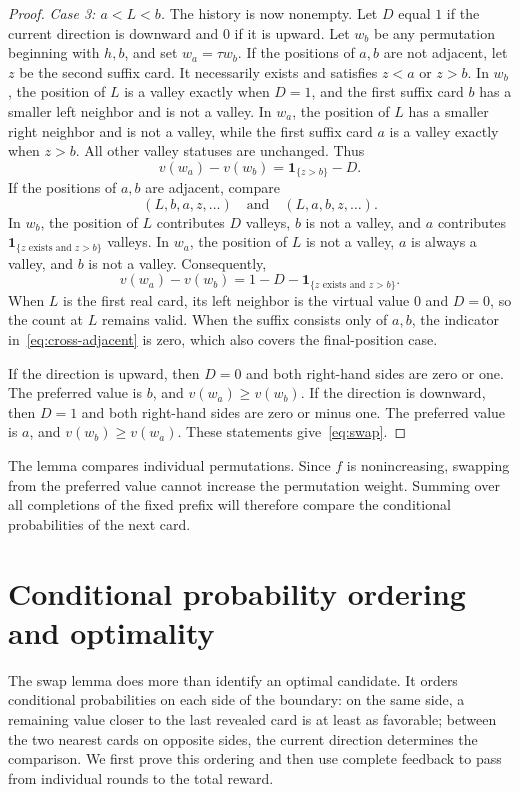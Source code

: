 \documentclass[10pt,a4paper]{amsart}
\numberwithin{equation}{section}
\begin{document}
\begin{proof}
\emph{Case 3: $a<L<b$.}
The history is now nonempty. Let $D$ equal $1$ if the current direction is downward and $0$ if it is upward. Let $w_b$ be any permutation beginning with $h,b$, and set $w_a=\tau w_b$. If the positions of $a,b$ are not adjacent, let $z$ be the second suffix card. It necessarily exists and satisfies $z<a$ or $z>b$. In $w_b$, the position of $L$ is a valley exactly when $D=1$, and the first suffix card $b$ has a smaller left neighbor and is not a valley. In $w_a$, the position of $L$ has a smaller right neighbor and is not a valley, while the first suffix card $a$ is a valley exactly when $z>b$. All other valley statuses are unchanged. Thus
\begin{equation}\label{eq:cross-separated}
 v(w_a)-v(w_b)=\mathbf1_{\{z>b\}}-D.
\end{equation}
If the positions of $a,b$ are adjacent, compare
\[
 (L,b,a,z,\ldots)\quad\text{and}\quad(L,a,b,z,\ldots).
\]
In $w_b$, the position of $L$ contributes $D$ valleys, $b$ is not a valley, and $a$ contributes $\mathbf1_{\{z\text{ exists and }z>b\}}$ valleys. In $w_a$, the position of $L$ is not a valley, $a$ is always a valley, and $b$ is not a valley. Consequently,
\begin{equation}\label{eq:cross-adjacent}
 v(w_a)-v(w_b)=1-D-\mathbf1_{\{z\text{ exists and }z>b\}}.
\end{equation}
When $L$ is the first real card, its left neighbor is the virtual value $0$ and $D=0$, so the count at $L$ remains valid. When the suffix consists only of $a,b$, the indicator in~\eqref{eq:cross-adjacent} is zero, which also covers the final-position case.

If the direction is upward, then $D=0$ and both right-hand sides are zero or one. The preferred value is $b$, and $v(w_a)\ge v(w_b)$. If the direction is downward, then $D=1$ and both right-hand sides are zero or minus one. The preferred value is $a$, and $v(w_b)\ge v(w_a)$. These statements give~\eqref{eq:swap}.
\end{proof}

The lemma compares individual permutations. Since $f$ is nonincreasing, swapping from the preferred value cannot increase the permutation weight. Summing over all completions of the fixed prefix will therefore compare the conditional probabilities of the next card.
\section{Conditional probability ordering and optimality}\label{sec:optimality}
The swap lemma does more than identify an optimal candidate. It orders conditional probabilities on each side of the boundary: on the same side, a remaining value closer to the last revealed card is at least as favorable; between the two nearest cards on opposite sides, the current direction determines the comparison. We first prove this ordering and then use complete feedback to pass from individual rounds to the total reward.
\end{document}
